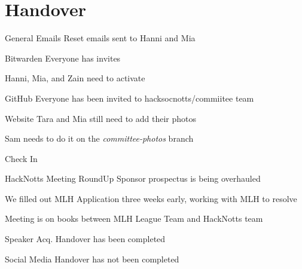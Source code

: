 \documentclass[11pt,hacksoc]{meetingmins}
\begin{document}
\maketitle

\section{Handover}
\begin{items}
	\item
	General
		\subitem
		Emails
			\subsubitem
			Reset emails sent to Hanni and Mia
		
		\subitem
		Bitwarden
			\subsubitem
			Everyone has invites
			
			\subsubitem
			Hanni, Mia, and Zain need to activate
		
		\subitem
		GitHub
			\subsubitem
			Everyone has been invited to hacksocnotts/commiitee team
		
		\subitem
		Website
			\subsubitem
			Tara and Mia still need to add their photos
			
			\subsubitem
			Sam needs to do it on the \textit{committee-photos} branch

	\item
	Check In
	
		\subitem
		HackNotts Meeting RoundUp
			\subitem
			Sponsor prospectus is being overhauled
			
			\subitem
			We filled out MLH Application three weeks early, working with MLH to resolve
			
			\subitem
			Meeting is on books between MLH League Team and HackNotts team
		
		\subitem
		Speaker Acq.
			\subsubitem
			Handover has been completed
		
		\subitem
		Social Media
			\subsubitem
			Handover has not been completed

\end{items}
\end{document}
